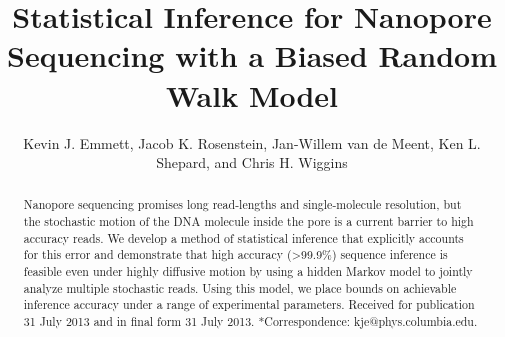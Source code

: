 \documentclass{biophys_letter}
\title{Statistical Inference for Nanopore Sequencing with a Biased Random Walk Model}
\author{Kevin J. Emmett,{\authdag *} Jacob K. Rosenstein,{\authpar} Jan-Willem van de Meent,{\authddag} Ken L. Shepard,{\addrS} and Chris H. Wiggins{\authddag}}
\begin{document}
\setcounter{page}{1} %

\pagestyle{headings}

\maketitle


\begin{abstract}
{Nanopore sequencing promises long read-lengths and single-molecule resolution, but the stochastic motion of the DNA molecule inside the pore is a current barrier to high accuracy reads.
We develop a method of statistical inference that explicitly accounts for this error and demonstrate that high accuracy (\textgreater 99.9\%) sequence inference is feasible even under highly diffusive motion by using a hidden Markov model to jointly analyze multiple stochastic reads.
Using this model, we place bounds on achievable inference accuracy under a range of experimental parameters.}
{Received for publication 31 July 2013 and in final form 31 July 2013.}
{*Correspondence: kje@phys.columbia.edu.}
\end{abstract}
\end{document}
